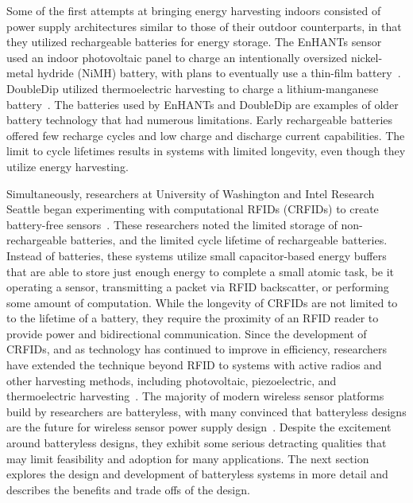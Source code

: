Some of the first attempts at bringing energy harvesting indoors consisted of power supply architectures similar to those of their outdoor counterparts, in that they utilized rechargeable batteries for energy storage.
The EnHANTs sensor used an indoor photovoltaic panel to charge an intentionally oversized nickel-metal hydride (NiMH)
battery, with plans to eventually use a thin-film battery~\cite{gorlatova2009challenge,margolies2015energy}.
DoubleDip utilized thermoelectric harvesting to charge a lithium-manganese battery~\cite{martin2012doubledip}.
The batteries used by EnHANTs and DoubleDip are examples of older battery technology that had numerous limitations. Early rechargeable batteries offered few recharge cycles and low charge and discharge current capabilities.
The limit to cycle lifetimes results in systems with limited longevity, even though they utilize energy harvesting.

Simultaneously, researchers at University of Washington and Intel Research Seattle began experimenting with computational RFIDs (CRFIDs) to create battery-free sensors~\cite{sample2008design}. 
These researchers noted the limited storage of non-rechargeable batteries, and the limited cycle lifetime of rechargeable batteries. 
Instead of batteries, these systems utilize small capacitor-based energy buffers that are able to store just enough energy to complete a small atomic task, be it operating a sensor, transmitting a packet via RFID backscatter, or performing some amount of computation. 
While the longevity of CRFIDs are not limited to to the lifetime of a battery, they require the proximity of an RFID reader to provide power and bidirectional communication. 
Since the development of CRFIDs, and as technology has continued to improve in efficiency, researchers have extended the technique beyond RFID to systems with active radios and other harvesting methods, including photovoltaic, piezoelectric, and thermoelectric harvesting~\cite{yervaGrafting12, debruin2013monjolo, hesterFlicker17, colinReconfigurable18, nardello2019camaroptera}. 
The majority of modern wireless sensor platforms build by researchers are batteryless, with many convinced that batteryless designs are the future for wireless sensor power supply design~\cite{hesterFlicker17,colinReconfigurable18,fraternali2018pible,truong2018capband,shukla2019skinnypower,hester2017future}.
Despite the excitement around batteryless designs, they exhibit some serious detracting qualities that may limit feasibility and adoption for many applications.
The next section explores the design and development of batteryless systems in more detail and describes the benefits and trade offs of the design.

